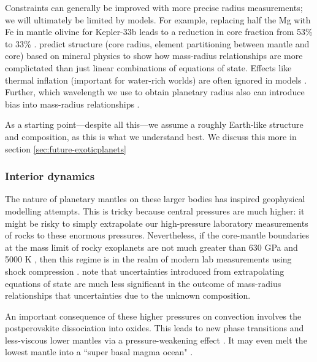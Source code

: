 Constraints can generally be improved with more precise radius measurements; we will ultimately be limited by models. For example, replacing half the Mg with Fe in mantle olivine for Kepler-33b leads to a reduction in core fraction from 53\% to 33\% \citep{Hakim2018}. \citet{Unterborn2016} predict structure (core radius, element partitioning between mantle and core) based on mineral physics to show how mass-radius relationships are more complictated than just linear combinations of equations of state. Effects like thermal inflation (important for water-rich worlds) are often ignored in models \citep{Thomas2016}. Further, which wavelength we use to obtain planetary radius also can introduce bias into mass-radius relationships \citep{Madhusudhan2015}.


As a starting point---despite all this---we assume a roughly Earth-like structure and composition, as this is what we understand best. We discuss this more in section \ref{sec:future-exoticplanets}




\subsubsection{Interior dynamics} \label{sec:superearth-dynamics}

The nature of planetary mantles on these larger bodies has inspired geophysical modelling attempts. This is tricky because central pressures are much higher: it might be risky to simply extrapolate our high-pressure laboratory measurements of rocks to these enormous pressures. Nevertheless, if the core-mantle boundaries at the mass limit of rocky exoplanets are not much greater than 630 GPa and 5000 K \citep{Unterborn2019}, then this regime is in the realm of modern lab measurements using shock compression \citep{Millot2015, Bolis2016}. \citet{Unterborn2019} note that uncertainties introduced from extrapolating equations of state are much less significant in the outcome of mass-radius relationships that uncertainties due to the unknown composition.

An important consequence of these higher pressures on convection involves the postperovskite dissociation into oxides. This leads to new phase transitions \citep[up to four, meaning a five-layered mantle;][]{vandenBerg2019} and less-viscous lower mantles via a pressure-weakening effect \citep{Umemoto2011, Karato2011, Tackley2013, Umemoto2017, Shahnas2018, Ritterbex2018, vandenBerg2019}. It may even melt the lowest mantle into a ``super basal magma ocean" \citep{Labrosse2007}. 

